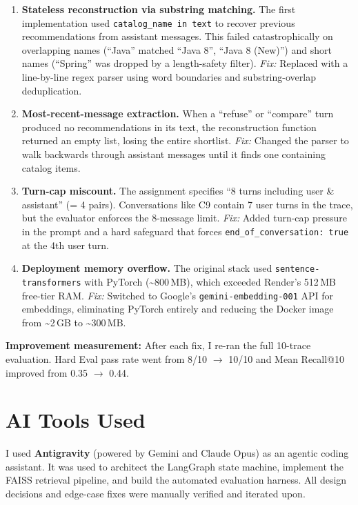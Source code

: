 \documentclass[11pt, a4paper]{article}
\begin{document}
\begin{enumerate}[leftmargin=1.5em, nosep]
    \item \textbf{Stateless reconstruction via substring matching.} The first implementation used \texttt{catalog\_name in text} to recover previous recommendations from assistant messages. This failed catastrophically on overlapping names (``Java'' matched ``Java 8'', ``Java 8 (New)'') and short names (``Spring'' was dropped by a length-safety filter). \emph{Fix:} Replaced with a line-by-line regex parser using word boundaries and substring-overlap deduplication.

    \item \textbf{Most-recent-message extraction.} When a ``refuse'' or ``compare'' turn produced no recommendations in its text, the reconstruction function returned an empty list, losing the entire shortlist. \emph{Fix:} Changed the parser to walk backwards through assistant messages until it finds one containing catalog items.

    \item \textbf{Turn-cap miscount.} The assignment specifies ``8 turns including user \& assistant'' (= 4 pairs). Conversations like C9 contain 7 user turns in the trace, but the evaluator enforces the 8-message limit. \emph{Fix:} Added turn-cap pressure in the prompt and a hard safeguard that forces \texttt{end\_of\_conversation: true} at the 4th user turn.
    
    \item \textbf{Deployment memory overflow.} The original stack used \texttt{sentence-transformers} with PyTorch (\textasciitilde800\,MB), which exceeded Render's 512\,MB free-tier RAM. \emph{Fix:} Switched to Google's \texttt{gemini-embedding-001} API for embeddings, eliminating PyTorch entirely and reducing the Docker image from \textasciitilde2\,GB to \textasciitilde300\,MB.
\end{enumerate}

\textbf{Improvement measurement:} After each fix, I re-ran the full 10-trace evaluation. Hard Eval pass rate went from 8/10 $\rightarrow$ 10/10 and Mean Recall@10 improved from 0.35 $\rightarrow$ 0.44.

\section{AI Tools Used}

I used \textbf{Antigravity} (powered by Gemini and Claude Opus) as an agentic coding assistant. It was used to architect the LangGraph state machine, implement the FAISS retrieval pipeline, and build the automated evaluation harness. All design decisions and edge-case fixes were manually verified and iterated upon.
\end{document}
